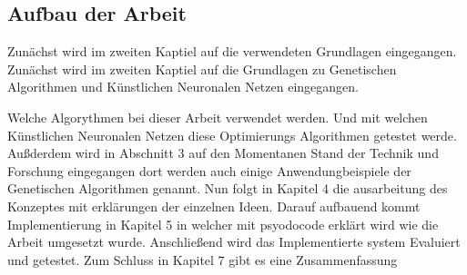 \subsection{Aufbau der Arbeit}
\label{sec:Aufbau der Arbeit}
Zunächst wird im zweiten Kaptiel auf die verwendeten Grundlagen eingegangen.
Zunächst wird im zweiten Kaptiel auf die Grundlagen zu Genetischen Algorithmen und Künstlichen Neuronalen Netzen eingegangen.

Welche Algorythmen bei dieser Arbeit verwendet werden. Und mit welchen Künstlichen Neuronalen Netzen diese Optimierungs Algorithmen getestet werde. Außderdem wird in Abschnitt 3 auf den Momentanen Stand der Technik und Forschung eingegangen dort werden auch einige Anwendungbeispiele der Genetischen Algorithmen genannt. Nun folgt in Kapitel 4 die ausarbeitung des Konzeptes mit erklärungen der einzelnen Ideen. Darauf aufbauend kommt Implementierung in Kapitel 5 in welcher mit psyodocode erklärt wird wie die Arbeit umgesetzt wurde. Anschließend wird das Implementierte system Evaluiert und getestet. Zum Schluss in Kapitel 7 gibt es eine Zusammenfassung

